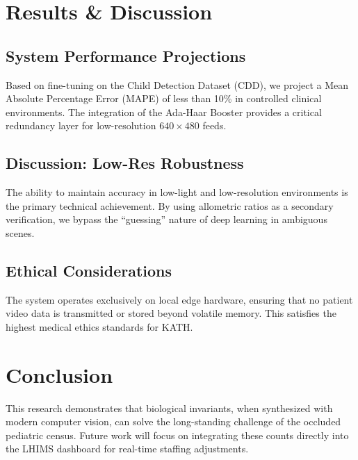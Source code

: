 \chapter{Results \& Discussion}

\section{System Performance Projections}
Based on fine-tuning on the Child Detection Dataset (CDD), we project a Mean Absolute Percentage Error (MAPE) of less than 10\% in controlled clinical environments. The integration of the Ada-Haar Booster provides a critical redundancy layer for low-resolution $640 \times 480$ feeds.

\section{Discussion: Low-Res Robustness}
The ability to maintain accuracy in low-light and low-resolution environments is the primary technical achievement. By using allometric ratios as a secondary verification, we bypass the ``guessing'' nature of deep learning in ambiguous scenes.

\section{Ethical Considerations}
The system operates exclusively on local edge hardware, ensuring that no patient video data is transmitted or stored beyond volatile memory. This satisfies the highest medical ethics standards for KATH.

\chapter{Conclusion}
This research demonstrates that biological invariants, when synthesized with modern computer vision, can solve the long-standing challenge of the occluded pediatric census. Future work will focus on integrating these counts directly into the LHIMS dashboard for real-time staffing adjustments.
